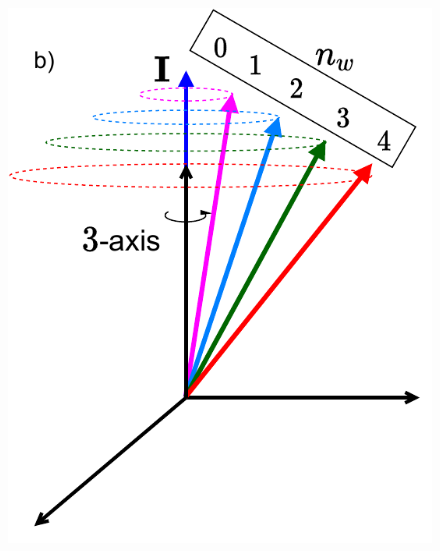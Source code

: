 \documentclass{beamer}
\begin{document}
\begin{frame}
\begin{figure}
    \includegraphics[scale=0.37]{Figs/wobbling_n_schematic-2.pdf}
  \end{figure}
\end{frame}
\end{document}
